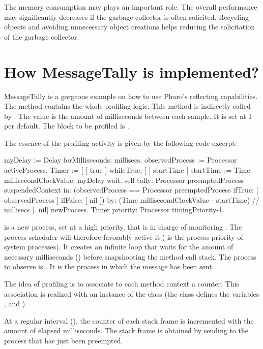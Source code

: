 \documentclass[a4paper,10pt,twoside]{book}
\begin{document}
The memory consumption may plays an important role. The overall performance may significantly decreases if the garbage collector is often solicited. Recycling objects and avoiding unnecessary object creations helps reducing the solicitation of the garbage collector.

\section {How MessageTally is implemented?}

MessageTally is a gorgeous example on how to use Pharo's reflecting capabilities. The method  contains the whole profiling logic. This method is indirectly called by . The  value is the amount of milliseconds between each sample. It is set at 1 per default. The block to be profiled is .

The essence of the profiling activity is given by the following code excerpt:

\begin{code}
myDelay := Delay forMilliseconds: millisecs.
observedProcess := Processor activeProcess.
Timer := [
	[ true ] whileTrue: [
		| startTime |
		startTime := Time millisecondClockValue.
		myDelay wait.
		self
			tally: Processor preemptedProcess suspendedContext
			in: (observedProcess == Processor preemptedProcess 
					ifTrue: [ observedProcess ] ifFalse: [ nil ])
			by: (Time millisecondClockValue - startTime) // millisecs ].
	nil] newProcess.
Timer priority: Processor timingPriority-1.
\end{code}

 is a new process, set at a high priority, that is in charge of monitoring . The process scheduler will therefore favorably active it ( is the process priority of system processes). It creates an infinite loop that waits for the amount of necessary milliseconds () before snapshooting the method call stack. The process to observe is . It is the process in which the message  has been sent. 

The idea of profiling is to associate to each method context a counter. This association is realized with an instance of the class  (the class defines the variables ,  and ).

At a regular interval (), the counter of each stack frame is incremented with the amount of elapsed milliseconds. The stack frame is obtained by sending  to the process that has just been preempted.
\end{document}

